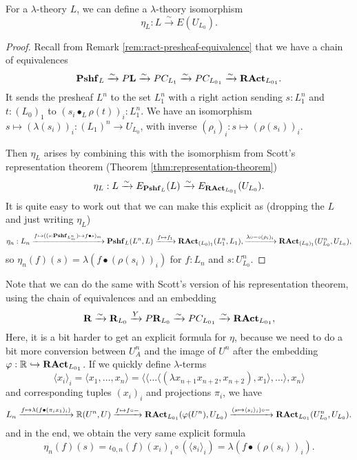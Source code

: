 \begin{lemma}
  For a $ \lambda $-theory $ L $, we can define a $ \lambda $-theory isomorphism
  \[ \eta_L: L \xrightarrow{\sim} E(U_{L_0}). \]
\end{lemma}
\begin{proof}
  Recall from Remark \ref{rem:ract-presheaf-equivalence} that we have a chain of equivalences
  \[ \mathbf{Pshf}_{L} \xrightarrow \sim P \mathbf L \xrightarrow \sim P C_{L_1} \xrightarrow \sim P C_{{L_0}_1} \xrightarrow \sim \mathbf{RAct}_{{L_0}_1}. \]
  It sends the presheaf $ L^n $ to the set $ L_1^n $ with a right action sending $ s: L_1^n $ and $ t: (L_0)_1 $ to $ (s_i \bullet_L \rho(t))_i : L_1^n $. We have an isomorphism $ s \mapsto (\lambda(s_i))_i: (L_1)^n \to U_{L_0} $, with inverse $ (\rho_i)_i : s \mapsto (\rho(s_i))_i $.

  Then $ \eta_L $ arises by combining this with the isomorphism from Scott's representation theorem (Theorem \ref{thm:representation-theorem})
  \[ \eta_L: L \xrightarrow \sim E_{\mathbf{Pshf}_{L}}(L) \xrightarrow \sim E_{\mathbf{RAct}_{{L_0}_1}}(U_{L_0}). \]
  It is quite easy to work out that we can make this explicit as (dropping the $ L $ and just writing $ \eta_L $)
  \[ \eta_n:
    L_n
      \xrightarrow{f \mapsto ((s : \mathbf{Pshf}_{L_m^n}) \mapsto f \bullet s)_m}
    \mathbf{Pshf}_{L}(L^n, L)
      \xrightarrow{f \mapsto f_1}
    \mathbf{RAct}_{(L_0)_1}(L_1^n, L_1),
      \xrightarrow{\lambda \circ - \circ (\rho_i)_i}
    \mathbf{RAct}_{(L_0)_1}(U_{L_0}^n, U_{L_0}),
  \]
  so $ \eta_n(f)(s) = \lambda(f \bullet (\rho(s_i))_i) $ for $ f: L_n $ and $ s: U_{L_0}^n $.
\end{proof}

\begin{remark}
  Note that we can do the same with Scott's version of his representation theorem, using the chain of equivalences and an embedding
  \[ \mathbf R \xrightarrow \sim \mathbf R_{L_0} \xrightarrow{Y} P \mathbf{R}_{L_0} \xrightarrow \sim P C_{{L_0}_1} \xrightarrow \sim \mathbf{RAct}_{{L_0}_1}, \]
  Here, it is a bit harder to get an explicit formula for $ \eta $, because we need to do a bit more conversion between $ U_A^n $ and the image of $ U^n $ after the embedding $ \varphi: \mathbb R \hookrightarrow \mathbf{RAct}_{{L_0}_1} $. If we quickly define $ \lambda $-terms
  \[ \langle x_i \rangle_i = \langle x_1, \dots, x_n \rangle = \langle \langle \dots \langle (\lambda x_{n + 1} x_{n + 2}, x_{n + 2}), x_1 \rangle, \dots\rangle, x_n \rangle \]
  and corresponding tuples $ (x_i)_i $ and projections $ \pi_i $, we have
  \[ L_n \xrightarrow{f \mapsto \lambda(f \bullet (\pi_i x_1)_i)} \mathbb R(U^n, U) \xrightarrow{f \mapsto f \circ -} \mathbf{RAct}_{{L_0}_1}(\varphi(U^n), U_{L_0}) \xrightarrow{(s \mapsto \langle s_i \rangle_i) \circ -} \mathbf{RAct}_{{L_0}_1}(U_{L_0}^n, U_{L_0}). \]
  and in the end, we obtain the very same explicit formula
  \[ \eta_n(f)(s) = \iota_{0, n}(f)(x_i)_i \circ (\langle s_i \rangle_i) = \lambda(f \bullet (\rho(s_i))_i). \]
\end{remark}


